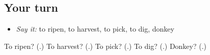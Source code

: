\subsection*{Your turn}
\begin{itemize}
\raggedright
  \item \emph{Say it:} to ripen, to harvest, to pick, to dig, donkey
\end{itemize}

\begin{tcolorbox}[breakable,colback=teal!4,colframe=teal!35!black,title={Before you move on}]
To ripen? (\textbf{}.) To harvest? (\textbf{}.) To pick? (\textbf{}.) To dig? (\textbf{}.) Donkey? (\textbf{}.)
\end{tcolorbox}
